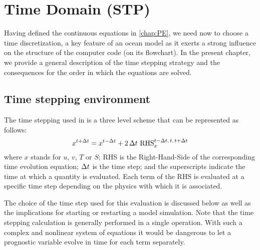 \documentclass[../main/NEMO_manual]{subfiles}
\begin{document}
\chapter{Time Domain (STP) }
\label{chap:STP}

\minitoc



\newpage

Having defined the continuous equations in \autoref{chap:PE}, we need now to choose a time discretization,
a key feature of an ocean model as it exerts a strong influence on the structure of the computer code
(\ie on its flowchart).
In the present chapter, we provide a general description of the \NEMO time stepping strategy and
the consequences for the order in which the equations are solved.

\section{Time stepping environment}
\label{sec:STP_environment}

The time stepping used in \NEMO is a three level scheme that can be represented as follows:
\begin{equation}
  \label{eq:STP}
  x^{t+\Delta t} = x^{t-\Delta t} + 2 \, \Delta t \  \text{RHS}_x^{t-\Delta t,\,t,\,t+\Delta t}
\end{equation} 
where $x$ stands for $u$, $v$, $T$ or $S$;
RHS is the Right-Hand-Side of the corresponding time evolution equation;
$\Delta t$ is the time step;
and the superscripts indicate the time at which a quantity is evaluated.
Each term of the RHS is evaluated at a specific time step depending on the physics with which it is associated.

The choice of the time step used for this evaluation is discussed below as well as
the implications for starting or restarting a model simulation.
Note that the time stepping calculation is generally performed in a single operation.
With such a complex and nonlinear system of equations it would be dangerous to let a prognostic variable evolve in
time for each term separately.
\end{document}
